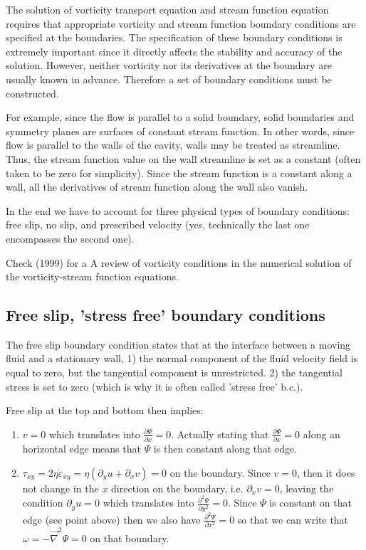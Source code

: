The solution of vorticity transport equation and stream function equation requires that appropriate
vorticity and stream function boundary conditions are specified at the boundaries. The specification
of these boundary conditions is extremely important since it directly affects the stability and accuracy
of the solution. However, neither vorticity nor its derivatives at the boundary
are usually known in advance. Therefore a set of boundary conditions must be constructed.

For example, since the flow is parallel to a solid boundary, solid boundaries and symmetry planes
are surfaces of constant stream function. In other words, since flow is parallel to the walls of the cavity, walls may be treated as streamline. Thus, the stream function value on the wall streamline is set as a constant (often taken to be zero for simplicity). Since the stream function is a constant along a wall, all the derivatives of stream function along the wall also vanish.

In the end we have to account for three physical types of boundary conditions:
free slip, no slip, and prescribed velocity (yes, technically the last one encompasses the second one).

Check \textcite{napq99} (1999) for a A review of vorticity conditions in the numerical solution of the vorticity-stream function equations.

\subsection{Free slip, 'stress free' boundary conditions}

The free slip boundary condition states that at the interface between a moving fluid and a stationary wall, 
1) the normal component of the fluid velocity field is equal to zero, but the tangential component is unrestricted. 
2) the tangential stress is set to zero (which is why it is often called 'stress free' b.c.).

Free slip at the top and bottom then implies: 
\begin{enumerate}
\item $v=0$ which translates into $\frac{\partial \Psi}{\partial x}=0$.
Actually stating that $\frac{\partial \Psi}{\partial x}=0$ along an horizontal 
edge means that $\Psi$ is then constant along that edge.

\item $\tau_{xy}=2 \eta \dot{\varepsilon}_{xy} =  \eta (\partial_y u + \partial_x v) =0$ on the boundary.
Since $v=0$, then it does not change in the $x$ direction on the boundary, i.e. $\partial_x v=0$, 
leaving the condition $\partial_y u = 0$ which translates into $\frac{\partial^2 \Psi}{\partial y^2}=0$. 
Since $\Psi$ is constant on that edge (see point above) then we also have $\frac{\partial^2 \Psi}{\partial x^2}=0$ so that we can write that $\omega=-\vec\nabla^2 \Psi=0$ on that boundary.
\end{enumerate}

